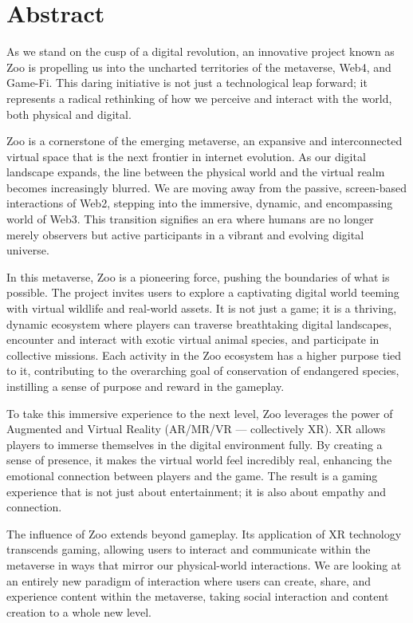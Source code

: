 \section{Abstract}
\label{sec:abstract}

As we stand on the cusp of a digital revolution, an innovative project known as Zoo is propelling us into the uncharted territories of the metaverse, Web4, and Game-Fi. This daring initiative is not just a technological leap forward; it represents a radical rethinking of how we perceive and interact with the world, both physical and digital.

Zoo is a cornerstone of the emerging metaverse, an expansive and interconnected virtual space that is the next frontier in internet evolution. As our digital landscape expands, the line between the physical world and the virtual realm becomes increasingly blurred. We are moving away from the passive, screen-based interactions of Web2, stepping into the immersive, dynamic, and encompassing world of Web3. This transition signifies an era where humans are no longer merely observers but active participants in a vibrant and evolving digital universe.

In this metaverse, Zoo is a pioneering force, pushing the boundaries of what is possible. The project invites users to explore a captivating digital world teeming with virtual wildlife and real-world assets. It is not just a game; it is a thriving, dynamic ecosystem where players can traverse breathtaking digital landscapes, encounter and interact with exotic virtual animal species, and participate in collective missions. Each activity in the Zoo ecosystem has a higher purpose tied to it, contributing to the overarching goal of conservation of endangered species, instilling a sense of purpose and reward in the gameplay.

To take this immersive experience to the next level, Zoo leverages the power of Augmented and Virtual Reality (AR/MR/VR --- collectively XR). XR allows players to immerse themselves in the digital environment fully. By creating a sense of presence, it makes the virtual world feel incredibly real, enhancing the emotional connection between players and the game. The result is a gaming experience that is not just about entertainment; it is also about empathy and connection.

The influence of Zoo extends beyond gameplay. Its application of XR technology transcends gaming, allowing users to interact and communicate within the metaverse in ways that mirror our physical-world interactions. We are looking at an entirely new paradigm of interaction where users can create, share, and experience content within the metaverse, taking social interaction and content creation to a whole new level.

